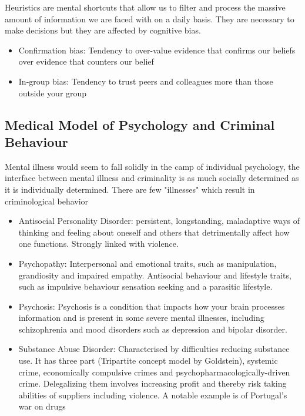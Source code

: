 \documentclass{article}
\begin{document}
Heuristics are mental shortcuts that allow us to filter and process the massive amount of information we are faced with on a daily basis. They are necessary to make decisions but they are affected by cognitive bias.
\begin{itemize}
    \item Confirmation bias: Tendency to over-value evidence that confirms our beliefs over evidence that counters our belief
	
    \item In-group bias: Tendency to trust peers and colleagues more than those outside your group
\end{itemize}

\subsection{Medical Model of Psychology and Criminal Behaviour}

Mental illness would seem to fall solidly in the camp of individual psychology, the interface between mental illness and criminality is as much socially determined as it is individually determined. There are few "illnesses" which result in criminological behavior
\begin{itemize}
    \item Antisocial Personality Disorder: persistent, longstanding, maladaptive ways of thinking and feeling about oneself and others that detrimentally affect how one functions. Strongly linked with violence.
    
    \item Psychopathy: Interpersonal and emotional traits, such as manipulation, grandiosity and impaired empathy. Antisocial behaviour and lifestyle traits, such as impulsive behaviour sensation seeking and a parasitic lifestyle.
    
    \item Psychosis: Psychosis is a condition that impacts how your brain processes information and is present in some severe mental illnesses, including schizophrenia and mood disorders such as depression and bipolar disorder.
    
    \item  Substance Abuse Disorder: Characterised by difficulties reducing substance use. It has three part (Tripartite concept model by Goldstein), systemic crime, economically compulsive crimes and psychopharmacologically-driven crime. Delegalizing them involves increasing profit and thereby risk taking abilities of suppliers including violence. A notable example is of Portugal's war on drugs
\end{itemize}
\end{document}
